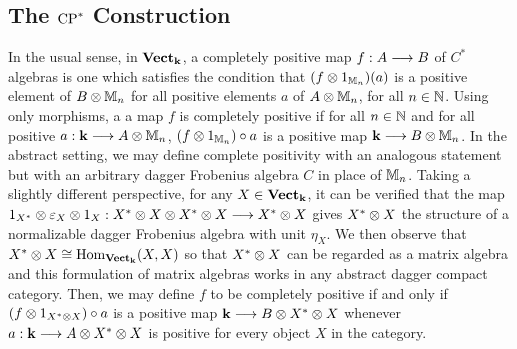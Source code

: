 
\subsection{The \texorpdfstring{$\CPS$}{CP Star} Construction}

In the usual sense, in $\textbf{Vect}_{\mathbf{k}}$, a completely positive map
$f : A \stackrel{}{\longrightarrow} B$ of $C^*$ algebras is one which satisfies the condition that
$(f \otimes 1_{\mathbb{M}_n})(a)$ is a positive element of $B \otimes \mathbb{M}_{n}$ for all positive
elements $a$ of $A \otimes \mathbb{M}_n$, for all $n \in \mathbb{N}$. Using only morphisms, a
a map $f$ is completely positive if for all $n \in \mathbb{N}$ and for all
positive $a : \mathbf{k} \stackrel{}{\longrightarrow} A \otimes \mathbb{M}_n$,
$(f \otimes 1_{\mathbb{M}_n}) \circ a$ is a positive map $\mathbf{k} \stackrel{}{\longrightarrow} B \otimes \mathbb{M}_n$. In the
abstract setting, we may define complete positivity with an analogous statement
but with an arbitrary dagger Frobenius algebra $C$ in place of $\mathbb{M}_n$. Taking a
slightly different perspective, for any $X \in \textbf{Vect}_{\mathbf{k}}$, it can be
verified that the map
$1_{X^*} \otimes \varepsilon_X \otimes 1_X : X^* \otimes X \otimes X^* \otimes X \stackrel{}{\longrightarrow} X^* \otimes X$ gives $X^* \otimes X$
the structure of a normalizable dagger Frobenius algebra
\cite[Prop. 2.11]{channels} with unit $\eta_X$. We then observe that
$X^* \otimes X \cong \text{Hom}_{\textbf{Vect}_{\mathbf{k}}}(X, X)$ so that $X^* \otimes X$ can be
regarded as a matrix algebra and this formulation of matrix algebras works in
any abstract dagger compact category.  Then, we may define $f$ to be
completely positive if and only if $(f \otimes 1_{X^* \otimes X}) \circ a$ is a positive
map $\mathbf{k} \stackrel{}{\longrightarrow} B \otimes X^* \otimes X$ whenever $a : \mathbf{k} \stackrel{}{\longrightarrow} A \otimes X^* \otimes X$
is positive for every object $X$ in the category.

